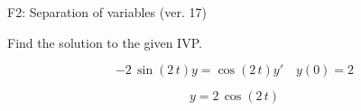 \begin{exercise}
  \begin{exerciseTitle}F2: Separation of variables (ver. 17)\end{exerciseTitle}
  \begin{exerciseStatement}
    
Find the solution to the given IVP.

    
\[-2 \, \sin\left(2 \, t\right) y= \cos\left(2 \, t\right) y'\hspace{1em} y\left( 0 \right)= 2\]

  \end{exerciseStatement}
  \begin{exerciseAnswer}
    
\[y= 2 \, \cos\left(2 \, t\right)\]

  \end{exerciseAnswer}
\end{exercise}